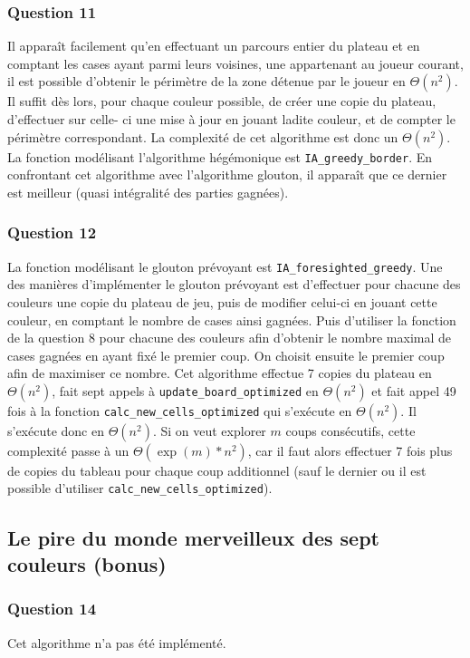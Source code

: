 \documentclass[12pt,a4paper,twoside]{article}
\begin{document}
\subsubsection*{Question 11}
\label{sec:orgheadline20}
Il apparaît facilement qu'en effectuant un parcours entier du plateau
et en comptant les cases ayant parmi leurs voisines, une appartenant au
joueur courant, il est possible d'obtenir le périmètre de la zone
détenue par le joueur en \(\Theta(n^{2})\). Il suffit dès lors, pour chaque
couleur possible, de créer une copie du plateau, d'effectuer sur celle-
ci une mise à jour en jouant ladite couleur, et de compter le
périmètre correspondant.
La complexité de cet algorithme est donc un \(\Theta(n^{2})\).
La fonction modélisant l'algorithme hégémonique est
\texttt{IA\_greedy\_border}.
En confrontant cet algorithme avec l'algorithme glouton, il apparaît
que ce dernier est meilleur (quasi intégralité des parties gagnées).

\subsubsection*{Question 12}
\label{sec:orgheadline21}
La fonction modélisant le glouton prévoyant est
\texttt{IA\_foresighted\_greedy}. 
Une des manières d'implémenter le glouton prévoyant est d'effectuer
pour chacune des couleurs une copie du plateau de jeu, puis de
modifier celui-ci en jouant cette couleur, en comptant le nombre de
cases ainsi gagnées. Puis d'utiliser la fonction de la question 8 pour
chacune des couleurs afin d'obtenir le nombre maximal de cases gagnées
en ayant fixé le premier coup. On choisit ensuite le premier coup afin
de maximiser ce nombre.  Cet algorithme effectue 7 copies du plateau
en \(\Theta(n^{2})\), fait sept appels à \texttt{update\_board\_optimized} en
\(\Theta(n^{2})\) et fait appel 49 fois à la fonction
\texttt{calc\_new\_cells\_optimized} qui s'exécute en \(\Theta(n^{2})\). Il s'exécute
donc en \(\Theta(n^{2})\).
Si on veut explorer \(m\) coups consécutifs, cette complexité passe à un
\(\Theta(\exp(m)*n^{2})\), car il faut alors effectuer 7 fois plus de copies du
tableau pour chaque coup additionnel (sauf le dernier ou il est possible
d'utiliser \texttt{calc\_new\_cells\_optimized}).

\subsection{Le pire du monde merveilleux des sept couleurs (bonus)}
\label{sec:orgheadline24}
\subsubsection*{Question 14}
\label{sec:orgheadline23}
Cet algorithme n'a pas été implémenté. 
\end{document}
